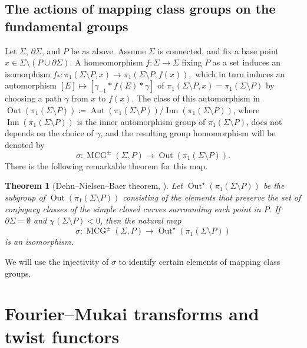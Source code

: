 \documentclass[12pt]{amsart}
\numberwithin{equation}{section}
\theoremstyle{plain}
\newtheorem{theorem}{Theorem}[section]
\theoremstyle{definition}
\DeclareMathOperator{\MCG}{\mathrm{MCG}}
\DeclareMathOperator{\Aut}{\mathrm{Aut}}
\DeclareMathOperator{\Inn}{\mathrm{Inn}}
\DeclareMathOperator{\Out}{\mathrm{Out}}
\begin{document}
\subsection{The actions of mapping class groups on the fundamental groups}
Let $\Sigma$, $\partial \Sigma$, and $P$ be as above.
Assume $\Sigma$ is connected, and fix a base point $x \in \Sigma \setminus (P \cup \partial \Sigma)$.
A homeomorphism $f \colon \Sigma \to \Sigma$ fixing $P$ as a set induces an isomorphism $f_* \colon \pi_1(\Sigma \setminus P, x) \to \pi_1(\Sigma \setminus P, f(x)), $ which in turn induces an automorphism $[E] \mapsto [\gamma_{-1} * f(E) * \gamma]$ of $\pi_1(\Sigma \setminus P, x) = \pi_1(\Sigma \setminus P)$ by choosing a path $\gamma$ from $x$ to $f(x)$.
The class of this automorphism in $\Out(\pi_1(\Sigma \setminus P)) \coloneqq \Aut(\pi_1(\Sigma \setminus P))/\Inn(\pi_1(\Sigma \setminus P))$, where $\Inn(\pi_1(\Sigma \setminus P))$ is the inner automorphism group of $\pi_1(\Sigma \setminus P)$, does not depends on the choice of $\gamma$, and the resulting group homomorphism will be denoted by
\begin{equation}
    \sigma \colon \MCG^{\pm}(\Sigma, P) \to \Out(\pi_1(\Sigma \setminus P)).
\end{equation}
There is the following remarkable theorem for this map.
\begin{theorem}[Dehn--Nielsen--Baer theorem, {\cite[Theorem 8.8]{MR2850125}}]\label{thm:Dehn--Nielsen--Baer}
    Let $\Out^\star(\pi_1(\Sigma \setminus P))$ be the subgroup of $\Out(\pi_1(\Sigma \setminus P))$
    consisting of the elements that preserve the set of conjugacy classes of the simple closed curves surrounding each point in $P$.
    If $\partial \Sigma = \emptyset$ and $\chi(\Sigma \setminus P)<0$, then the natural map
    \begin{equation}
        \sigma \colon \MCG^{\pm}(\Sigma, P) \to \Out^\star(\pi_1(\Sigma \setminus P))
    \end{equation}
    is an isomorphism.
\end{theorem}
We will use the injectivity of $\sigma$ to identify certain elements of mapping class groups.








\section{Fourier--Mukai transforms and twist functors}\label{section:fourier-mukai-transforms-and-twist-functors}
\end{document}
